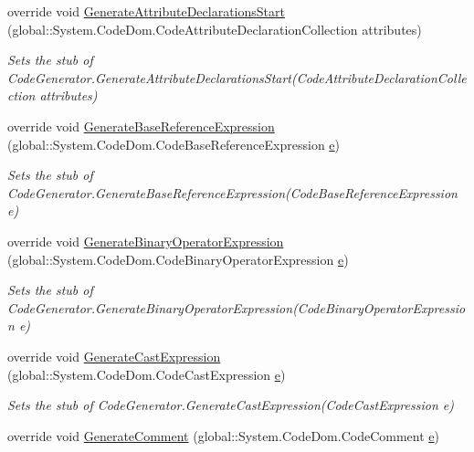 \begin{DoxyCompactItemize}
override void \hyperlink{class_system_1_1_code_dom_1_1_compiler_1_1_fakes_1_1_stub_code_generator_ae933045ac167041f50926a11b7300e10}{Generate\-Attribute\-Declarations\-Start} (global\-::\-System.\-Code\-Dom.\-Code\-Attribute\-Declaration\-Collection attributes)
\begin{DoxyCompactList}\small\item\em Sets the stub of Code\-Generator.\-Generate\-Attribute\-Declarations\-Start(\-Code\-Attribute\-Declaration\-Collection attributes)\end{DoxyCompactList}\item 
override void \hyperlink{class_system_1_1_code_dom_1_1_compiler_1_1_fakes_1_1_stub_code_generator_ac19b6b89bcf8838569713e5560ffe1d1}{Generate\-Base\-Reference\-Expression} (global\-::\-System.\-Code\-Dom.\-Code\-Base\-Reference\-Expression \hyperlink{jquery-1_810_82_8min_8js_a2c038346d47955cbe2cb91e338edd7e1}{e})
\begin{DoxyCompactList}\small\item\em Sets the stub of Code\-Generator.\-Generate\-Base\-Reference\-Expression(\-Code\-Base\-Reference\-Expression e)\end{DoxyCompactList}\item 
override void \hyperlink{class_system_1_1_code_dom_1_1_compiler_1_1_fakes_1_1_stub_code_generator_a446f6872b18b17cf0dbe28ed6fee2ea7}{Generate\-Binary\-Operator\-Expression} (global\-::\-System.\-Code\-Dom.\-Code\-Binary\-Operator\-Expression \hyperlink{jquery-1_810_82_8min_8js_a2c038346d47955cbe2cb91e338edd7e1}{e})
\begin{DoxyCompactList}\small\item\em Sets the stub of Code\-Generator.\-Generate\-Binary\-Operator\-Expression(\-Code\-Binary\-Operator\-Expression e)\end{DoxyCompactList}\item 
override void \hyperlink{class_system_1_1_code_dom_1_1_compiler_1_1_fakes_1_1_stub_code_generator_a182a83e85da839be2a69159f07a6b34d}{Generate\-Cast\-Expression} (global\-::\-System.\-Code\-Dom.\-Code\-Cast\-Expression \hyperlink{jquery-1_810_82_8min_8js_a2c038346d47955cbe2cb91e338edd7e1}{e})
\begin{DoxyCompactList}\small\item\em Sets the stub of Code\-Generator.\-Generate\-Cast\-Expression(\-Code\-Cast\-Expression e)\end{DoxyCompactList}\item 
override void \hyperlink{class_system_1_1_code_dom_1_1_compiler_1_1_fakes_1_1_stub_code_generator_ac5e976adc7af245a82acf5cc6f5299f4}{Generate\-Comment} (global\-::\-System.\-Code\-Dom.\-Code\-Comment \hyperlink{jquery-1_810_82_8min_8js_a2c038346d47955cbe2cb91e338edd7e1}{e})

\end{DoxyCompactItemize}
